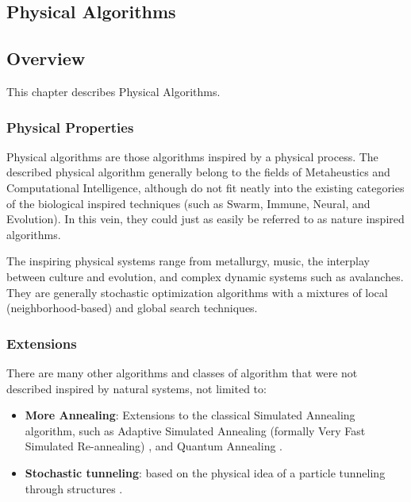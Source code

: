 

\renewcommand{\bibsection}{\subsection{\bibname}}
\begin{bibunit}

\chapter{Physical Algorithms}
\label{ch:physical}

\section{Overview}
This chapter describes Physical Algorithms.


\subsection{Physical Properties}
Physical algorithms are those algorithms inspired by a physical process. The described physical algorithm generally belong to the fields of Metaheustics and Computational Intelligence, although do not fit neatly into the existing categories of the biological inspired techniques (such as Swarm, Immune, Neural, and Evolution). In this vein, they could just as easily be referred to as nature inspired algorithms.

The inspiring physical systems range from metallurgy, music, the interplay between culture and evolution, and complex dynamic systems such as avalanches. They are generally stochastic optimization algorithms with a mixtures of local (neighborhood-based) and global search techniques.

% 
% 
\subsection{Extensions}
There are many other algorithms and classes of algorithm that were not described inspired by natural systems, not limited to:

\begin{itemize}
	\item \textbf{More Annealing}: Extensions to the classical Simulated Annealing algorithm, such as Adaptive Simulated Annealing (formally Very Fast Simulated Re-annealing) \cite{Ingber1989, Ingber1996}, and Quantum Annealing \cite{Apolloni1989, Das2005}.
	\item \textbf{Stochastic tunneling}: based on the physical idea of a particle tunneling through structures \cite{Wenzel1999}.
\end{itemize}

\putbib
\end{bibunit}

